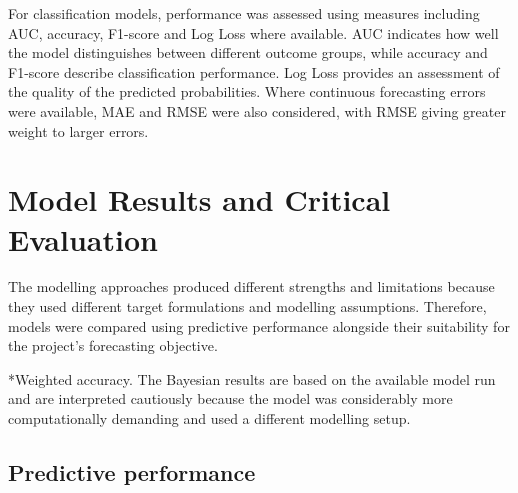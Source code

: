 \documentclass[ %
                    author={Ashrey Ashrey, Sanya Kapoor, Trisha Sharma, Yash Bhooshan Pandloskar},
                supervisor={Dr. Dalila O’Grady},
                    degree={MSc},
                     title={Using machine learning to forecast physical activity participation, volunteering and activity patterns in London},
                  subtitle={},
                      type={},
                      year={2021}]{dissertation}
\begin{document}
For classification models, performance was assessed using measures including AUC, accuracy, F1-score and Log Loss where available. AUC indicates how well the model distinguishes between different outcome groups, while accuracy and F1-score describe classification performance. Log Loss provides an assessment of the quality of the predicted probabilities. Where continuous forecasting errors were available, MAE and RMSE were also considered, with RMSE giving greater weight to larger errors.

\FloatBarrier
\section{Model Results and Critical Evaluation}

\noindent
The modelling approaches produced different strengths and limitations because they used different target formulations and modelling assumptions. Therefore, models were compared using predictive performance alongside their suitability for the project's forecasting objective.

\begin{table}[!htb]
\centering
{}
\caption{Model-specific performance metrics}
\label{tab:model-results}
\end{table}

\noindent
*Weighted accuracy. The Bayesian results are based on the available model run and are interpreted cautiously because the model was considerably more computationally demanding and used a different modelling setup.

\FloatBarrier
\subsection{Predictive performance}
\end{document}
